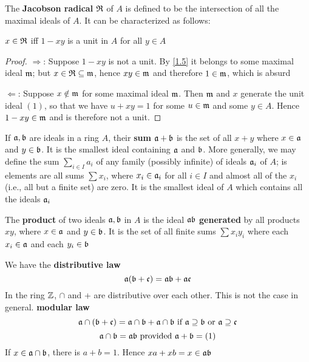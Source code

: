 \documentclass[11pt]{article}
\begin{document}
The \textbf{Jacobson radical} \(\mathfrak{R}\) of \(A\) is defined to be the intersection of all the maximal ideals
of \(A\). It can be characterized as follows:

\begin{proposition}[]
\(x\in\mathfrak{R}\) iff \(1-xy\) is a unit in \(A\) for all \(y\in A\)
\end{proposition}

\begin{proof}
\(\Rightarrow\): Suppose \(1-xy\) is not a unit. By \ref{1.5} it belongs to some maximal ideal \(\mathfrak{m}\);
but \(x\in\mathfrak{R}\subseteq\mathfrak{m}\), hence \(xy\in\mathfrak{m}\) and therefore \(1\in\mathfrak{m}\), which is absurd

\(\Leftarrow\): Suppose \(x\notin\mathfrak{m}\) for some maximal ideal \(\mathfrak{m}\). Then \(\mathfrak{m}\) and \(x\) generate the unit
ideal \((1)\), so that we have \(u+xy=1\) for some \(u\in\mathfrak{m}\) and some \(y\in A\). Hence \(1-xy\in\mathfrak{m}\)
and is therefore not a unit.
\end{proof}

If \(\mathfrak{a},\mathfrak{b}\) are ideals in a ring \(A\), their \textbf{sum} \(\mathfrak{a}+\mathfrak{b}\) is the set of all \(x+y\) where \(x\in\mathfrak{a}\)
and \(y\in\mathfrak{b}\). It is the smallest ideal containing \(\mathfrak{a}\) and \(\mathfrak{b}\). More generally, we may define
the sum \(\sum_{i\in I}a_i\) of any family (possibly infinite) of ideals \(\mathfrak{a}_i\) of \(A\); is elements
are all sums \(\sum x_i\), where \(x_i\in\mathfrak{a}_i\) for all \(i\in I\) and almost all of the \(x_i\) (i.e., all
but a finite set) are zero. It is the smallest ideal of \(A\) which contains all the ideals \(\mathfrak{a}_i\)

The \textbf{product} of two ideals \(\mathfrak{a},\mathfrak{b}\) in \(A\) is the ideal \(\mathfrak{a}\mathfrak{b}\) \textbf{generated} by all products \(xy\),
where \(x\in\mathfrak{a}\) and \(y\in\mathfrak{b}\). It is the set of all finite sums \(\sum x_iy_i\) where each \(x_i\in\mathfrak{a}\) and
each \(y_i\in\mathfrak{b}\)

We have the \textbf{distributive law}
\begin{equation*}
\mathfrak{a}(\mathfrak{b}+\mathfrak{c})=\mathfrak{a}\mathfrak{b}+\mathfrak{a}\mathfrak{c}
\end{equation*}
In the ring \(\mathbb{Z}\), \(\cap\) and + are distributive over each other. This is not the case in
general. \textbf{modular law}
\begin{equation*}
\mathfrak{a}\cap(\mathfrak{b}+\mathfrak{c})=\mathfrak{a}\cap\mathfrak{b}+\mathfrak{a}\cap\mathfrak{b}\text{ if }\mathfrak{a}\supseteq\mathfrak{b}\text{ or }\mathfrak{a}\supseteq\mathfrak{c}
\end{equation*}
\begin{equation*}
\mathfrak{a}\cap\mathfrak{b}=\mathfrak{a}\mathfrak{b}\text{ provided }\mathfrak{a}+\mathfrak{b}=(1)
\end{equation*}
If \(x\in\mathfrak{a}\cap\mathfrak{b}\), there is \(a+b=1\). Hence \(xa+xb=x\in\mathfrak{a}\mathfrak{b}\)
\end{document}
